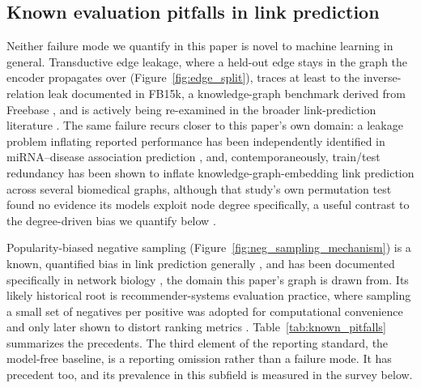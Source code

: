 \documentclass[review]{elsarticle}
\begin{document}
\subsection{Known evaluation pitfalls in link prediction}
Neither failure mode we quantify in this paper is novel to machine learning in general.
Transductive edge leakage, where a held-out edge stays in the graph the encoder propagates over (Figure~\ref{fig:edge_split}), traces at least to the inverse-relation leak documented
in FB15k, a knowledge-graph benchmark derived from Freebase \cite{toutanova2015observed}, and is actively
being re-examined in the broader link-prediction literature
\cite{zhu2023pitfalls,li2023evaluating}. The same failure recurs closer to this paper's
own domain: a leakage problem inflating reported performance has been independently
identified in miRNA--disease association prediction \cite{dong2020mirnaleakage}, and,
contemporaneously, train/test redundancy has been shown to inflate knowledge-graph-embedding
link prediction across several biomedical graphs, although that study's own permutation
test found no evidence its models exploit node degree specifically, a useful contrast to
the degree-driven bias we quantify below \cite{briere2026kgeleakage}.

Popularity-biased negative sampling (Figure~\ref{fig:neg_sampling_mechanism}) is a known, quantified bias in link prediction generally \cite{kotnis2017analysis,
aiyappa2024implicit}, and has been documented specifically in network biology
\cite{yilmaz2025biasaware}, the domain this paper's graph is drawn from. Its likely
historical root is recommender-systems evaluation practice, where sampling a small set
of negatives per positive was adopted for computational convenience and only later
shown to distort ranking metrics \cite{krichene2020sampled}. Table~\ref{tab:known_pitfalls}
summarizes the precedents. The third element of the reporting standard, the model-free baseline, is a reporting omission rather than a failure mode. It has precedent too, and its prevalence in this subfield is measured in the survey below.
\end{document}
